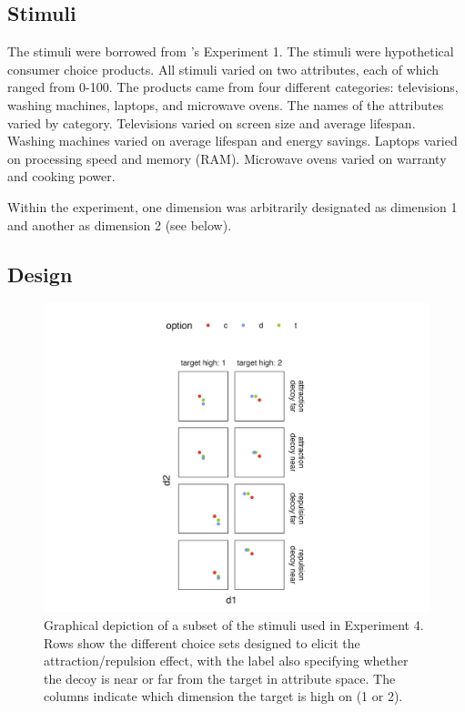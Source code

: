 \subsection{Stimuli}

The stimuli were borrowed from \textcite{banerjeeFactorsThatPromote2024}'s Experiment 1. The stimuli were hypothetical consumer choice products. All stimuli varied on two attributes, each of which ranged from 0-100. The products came from four different categories: televisions, washing machines, laptops, and microwave ovens. The names of the attributes varied by category. Televisions varied on screen size and average lifespan. Washing machines varied on average lifespan and energy savings. Laptops varied on processing speed and memory (RAM). Microwave ovens varied on warranty and cooking power. 

Within the experiment, one dimension was arbitrarily designated as dimension 1 and another as dimension 2 (see below). 

\subsection{Design}

\begin{figure}
    \includegraphics{figures/ce_rating_stim_for_paper.jpeg}
    \caption{Graphical depiction of a subset of the stimuli used in Experiment 4. Rows show the different choice sets designed to elicit the attraction/repulsion effect, with the label also specifying whether the decoy is near or far from the target in attribute space. The columns indicate which dimension the target is high on (1 or 2).}
    \label{fig:ce_rating_stim}
\end{figure}